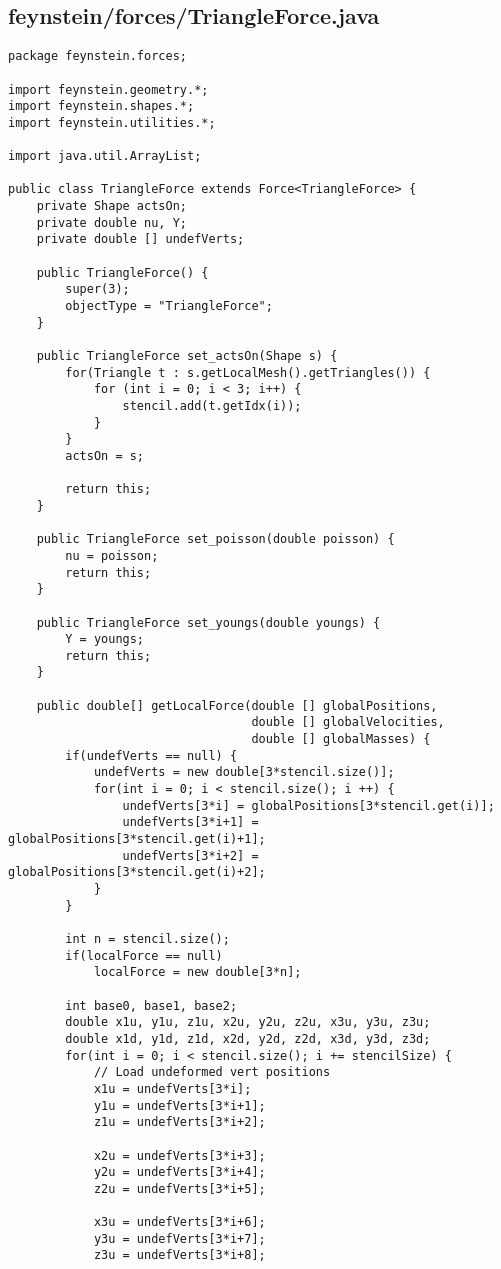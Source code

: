 \subsection*{feynstein/forces/TriangleForce.java}
\begin{lstlisting}
package feynstein.forces;

import feynstein.geometry.*;
import feynstein.shapes.*;
import feynstein.utilities.*;

import java.util.ArrayList;

public class TriangleForce extends Force<TriangleForce> {
    private Shape actsOn;
    private double nu, Y;
	private double [] undefVerts;
	
    public TriangleForce() {
		super(3);
		objectType = "TriangleForce";
    }

    public TriangleForce set_actsOn(Shape s) {
		for(Triangle t : s.getLocalMesh().getTriangles()) {
			for (int i = 0; i < 3; i++) {
				stencil.add(t.getIdx(i));
			}
		}
		actsOn = s;
		
		return this;
    }

    public TriangleForce set_poisson(double poisson) {
		nu = poisson;
		return this;
    }

    public TriangleForce set_youngs(double youngs) {
		Y = youngs;
		return this;
    }
	
	public double[] getLocalForce(double [] globalPositions,
								  double [] globalVelocities,
								  double [] globalMasses) {
		if(undefVerts == null) {
			undefVerts = new double[3*stencil.size()];
			for(int i = 0; i < stencil.size(); i ++) {
				undefVerts[3*i] = globalPositions[3*stencil.get(i)];
				undefVerts[3*i+1] = globalPositions[3*stencil.get(i)+1];
				undefVerts[3*i+2] = globalPositions[3*stencil.get(i)+2];
			}
		}
		
		int n = stencil.size();
		if(localForce == null)
			localForce = new double[3*n];
		
		int base0, base1, base2;
		double x1u, y1u, z1u, x2u, y2u, z2u, x3u, y3u, z3u;
		double x1d, y1d, z1d, x2d, y2d, z2d, x3d, y3d, z3d;
		for(int i = 0; i < stencil.size(); i += stencilSize) {
			// Load undeformed vert positions
			x1u = undefVerts[3*i];
			y1u = undefVerts[3*i+1];
			z1u = undefVerts[3*i+2];
			
			x2u = undefVerts[3*i+3];
			y2u = undefVerts[3*i+4];
			z2u = undefVerts[3*i+5];
			
			x3u = undefVerts[3*i+6];
			y3u = undefVerts[3*i+7];
			z3u = undefVerts[3*i+8];
			

\end{lstlisting}
